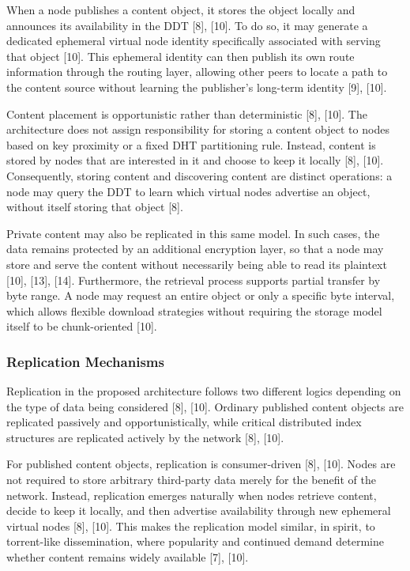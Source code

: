 \documentclass[12pt,a4paper]{article}
\begin{document}
When a node publishes a content object, it stores the object locally and announces its availability in the DDT [8], [10]. To do so, it may generate a dedicated ephemeral virtual node identity specifically associated with serving that object [10]. This ephemeral identity can then publish its own route information through the routing layer, allowing other peers to locate a path to the content source without learning the publisher's long-term identity [9], [10].

Content placement is opportunistic rather than deterministic [8], [10]. The architecture does not assign responsibility for storing a content object to nodes based on key proximity or a fixed DHT partitioning rule. Instead, content is stored by nodes that are interested in it and choose to keep it locally [8], [10]. Consequently, storing content and discovering content are distinct operations: a node may query the DDT to learn which virtual nodes advertise an object, without itself storing that object [8].

Private content may also be replicated in this same model. In such cases, the data remains protected by an additional encryption layer, so that a node may store and serve the content without necessarily being able to read its plaintext [10], [13], [14]. Furthermore, the retrieval process supports partial transfer by byte range. A node may request an entire object or only a specific byte interval, which allows flexible download strategies without requiring the storage model itself to be chunk-oriented [10].

\subsubsection{Replication Mechanisms}

Replication in the proposed architecture follows two different logics depending on the type of data being considered [8], [10]. Ordinary published content objects are replicated passively and opportunistically, while critical distributed index structures are replicated actively by the network [8], [10].

For published content objects, replication is consumer-driven [8], [10]. Nodes are not required to store arbitrary third-party data merely for the benefit of the network. Instead, replication emerges naturally when nodes retrieve content, decide to keep it locally, and then advertise availability through new ephemeral virtual nodes [8], [10]. This makes the replication model similar, in spirit, to torrent-like dissemination, where popularity and continued demand determine whether content remains widely available [7], [10].
\end{document}
